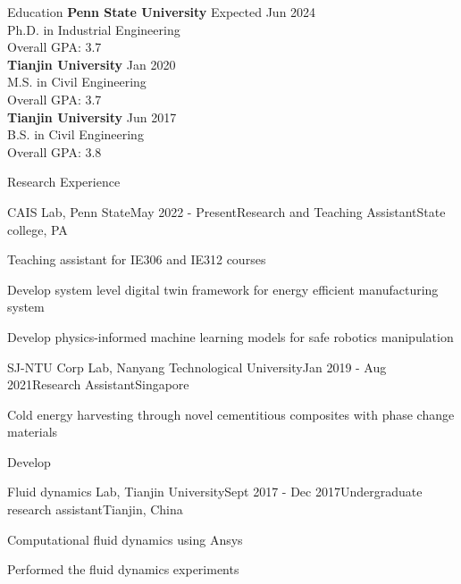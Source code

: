 \documentclass{resume}
\begin{document}

\begin{rSection}{Education}
{\bf Penn State University} \hfill {Expected Jun 2024} \\ 
Ph.D. in Industrial Engineering \\
Overall GPA: 3.7\\
{\bf Tianjin University} \hfill {Jan 2020} \\ 
M.S. in Civil Engineering \\
Overall GPA: 3.7\\
{\bf Tianjin University} \hfill {Jun 2017} \\ 
B.S. in Civil Engineering \\
Overall GPA: 3.8
\end{rSection}

\begin{rSection}{Research Experience}

\begin{rSubsection}{CAIS Lab, Penn State}{May 2022 - Present}{Research and Teaching Assistant}{State college, PA}
\item Teaching assistant for IE306 and IE312 courses
\item Develop system level digital twin framework for energy efficient manufacturing system
\item Develop physics-informed machine learning models for safe robotics manipulation 
\end{rSubsection}

\begin{rSubsection}{SJ-NTU Corp Lab, Nanyang Technological University}{Jan 2019 - Aug 2021}{Research Assistant}{Singapore}
\item Cold energy harvesting through novel cementitious composites with phase change materials
\item Develop 
\end{rSubsection}

\begin{rSubsection}{Fluid dynamics Lab, Tianjin University}{Sept 2017 - Dec 2017}{Undergraduate research assistant}{Tianjin, China}
\item Computational fluid dynamics using Ansys
\item Performed the fluid dynamics experiments
\end{rSubsection}

\end{rSection}
\end{document}
